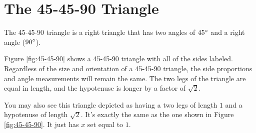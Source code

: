 \section{The 45-45-90 Triangle}
The 45-45-90 triangle is a right triangle that has two angles of $45\degree$ and a right angle ($90\degree$).
\begin{center}
    \begin{minipage}[c]{0.45\linewidth}
        \centering
        \label{fig:45-45-90}
    \end{minipage}
    \begin{minipage}[c]{0.50\linewidth}
        Figure \ref{fig:45-45-90} shows a 45-45-90 triangle with all of the sides labeled. Regardless of the size and orientation of a 45-45-90 triangle, the side proportions and angle measurements will remain the same. The two legs of the triangle are equal in length, and the hypotenuse is longer by a factor of $\sqrt{2}$.
    \end{minipage}
\end{center}
You may also see this triangle depicted as having a two legs of length $1$ and a hypotenuse of length $\sqrt{2}$. It's exactly the same as the one shown in Figure \ref{fig:45-45-90}. It just has $x$ set equal to $1$.
